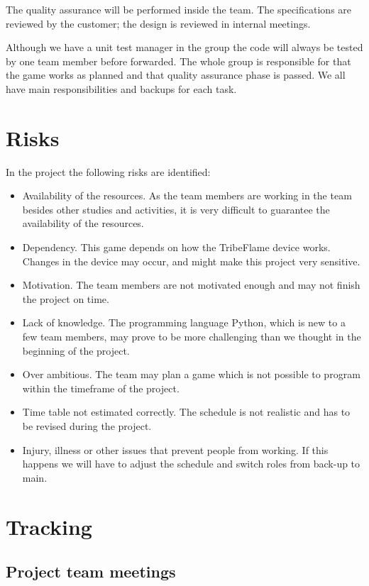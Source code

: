 \documentclass[12pt,a4paper]{article}
\begin{document}
The quality assurance will be performed inside the team. The
specifications are reviewed by the customer; the design is reviewed in
internal meetings.

Although we have a unit test manager in the group the code will always
be tested by one team member before forwarded. The whole group is
responsible for that the game works as planned and that quality
assurance phase is passed. We all have main responsibilities and
backups for each task.

\section{Risks}

In the project the following risks are identified:

\begin{itemize}
\item Availability of the resources. As the team members are working in the team besides other studies and activities, it is very difficult to guarantee the availability of the resources.
\item Dependency. This game depends on how the TribeFlame device works. Changes in the device may occur, and might make this project very sensitive.
\item Motivation. The team members are not motivated enough and may not finish the project on time.
\item Lack of knowledge. The programming language Python, which is new to a few team members, may prove to be more challenging than we thought in the beginning of the project.
\item Over ambitious. The team may plan a game which is not possible to program within the timeframe of the project.
\item Time table not estimated correctly. The schedule is not realistic and has to be revised during the project.
\item Injury, illness or other issues that prevent people from working. If this happens we will have to adjust the schedule and switch roles from back-up to main.
\end{itemize}

\section{Tracking}

\subsection{Project team meetings}
\end{document}
